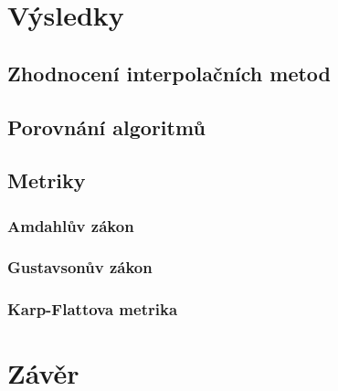 \documentclass[]{thesiskiv}
\begin{document}
\chapter{Výsledky}

\section{Zhodnocení interpolačních metod}

\section{Porovnání algoritmů}

\section{Metriky}

\subsection{Amdahlův zákon}

\subsection{Gustavsonův zákon}

\subsection{Karp-Flattova metrika}




\chapter{Závěr}
\end{document}
